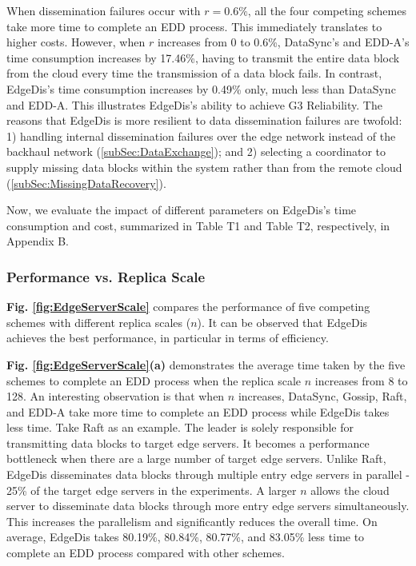 \documentclass[10pt,journal,compsoc]{IEEEtran}
\begin{document}
When dissemination failures occur with $r=0.6\%$, all the four competing schemes take more time to complete an EDD process. This immediately translates to higher costs. However, when $r$ increases from 0 to 0.6\%, DataSync's and EDD-A’s time consumption increases by 17.46\%, having to transmit the entire data block from the cloud every time the transmission of a data block fails. In contrast, EdgeDis's time consumption increases by 0.49\% only, much less than DataSync and EDD-A. This illustrates EdgeDis's ability to achieve G3 Reliability. The reasons that EdgeDis is more resilient to data dissemination failures are twofold: 1) handling internal dissemination failures over the edge network instead of the backhaul network (\cref{subSec:DataExchange}); and 2) selecting a coordinator to supply missing data blocks within the system rather than from the remote cloud (\cref{subSec:MissingDataRecovery}).


 Now, we evaluate the impact of different parameters on EdgeDis's time consumption and cost, summarized in Table T1 and Table T2, respectively, in Appendix B.

\subsubsection{Performance vs. Replica Scale}

\textbf{Fig. \ref{fig:EdgeServerScale} }compares the performance of five competing schemes with different replica scales ($n$). It can be observed that EdgeDis achieves the best performance, in particular in terms of efficiency.


\textbf{Fig. \ref{fig:EdgeServerScale}(a)} demonstrates the average time taken by the five schemes to complete an EDD process when the replica scale $n$ increases from 8 to 128. An interesting observation is that when $n$ increases, DataSync, Gossip, Raft, and EDD-A take more time to complete an EDD process while EdgeDis takes less time. Take Raft as an example. The leader is solely responsible for transmitting data blocks to target edge servers. It becomes a performance bottleneck when there are a large number of target edge servers. Unlike Raft, EdgeDis disseminates data blocks through multiple entry edge servers in parallel - 25\% of the target edge servers in the experiments. A larger $n$ allows the cloud server to disseminate data blocks through more entry edge servers simultaneously. This increases the parallelism and significantly reduces the overall time. On average, EdgeDis takes 80.19\%, 80.84\%, 80.77\%, and 83.05\% less time to complete an EDD process compared with other schemes.
\end{document}
